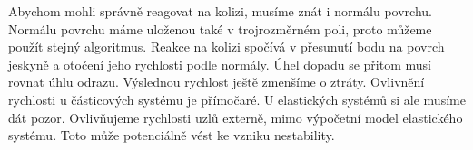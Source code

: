 Abychom mohli správně reagovat na kolizi, musíme znát i normálu povrchu.
Normálu povrchu máme uloženou také v trojrozměrném poli, proto můžeme použít stejný algoritmus.
Reakce na kolizi spočívá v přesunutí bodu na povrch jeskyně a otočení jeho rychlosti podle normály.
Úhel dopadu se přitom musí rovnat úhlu odrazu.
Výslednou rychlost ještě zmenšíme o ztráty.
Ovlivnění rychlosti u částicových systému je přímočaré.
U elastických systémů si ale musíme dát pozor.
Ovlivňujeme rychlosti uzlů externě, mimo výpočetní model elastického systému.
Toto může potenciálně vést ke vzniku nestability.

